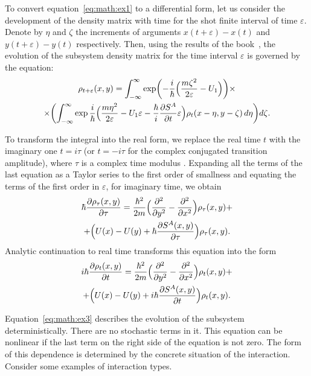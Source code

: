 To convert equation~\eqref{eq:math:ex1} to a differential form, let us consider the development of the density matrix with time for the shot finite interval of time $\varepsilon$. Denote by $\eta$ and $\zeta$ the increments of arguments $x(t+\varepsilon)-x(t)$ and $y(t+\varepsilon)-y(t)$ respectively. Then, using the results of the book~\cite{bib:12}, the evolution of the subsystem density matrix for the time interval $\varepsilon$ is governed by the equation:
\begin{multline*}
\rho_{t+\varepsilon}(x,y)=\int _{-\infty}^{\infty}\exp\biggl(-\frac{i}{\hbar}\Bigl(\frac{m\zeta^2}{2\varepsilon}-U_1\Bigr)\biggr) 
\times 
\\
\times 
\biggl(\int _{-\infty}^{\infty}\exp\frac{i}{\hbar}\Bigl(\frac{m\eta^2}{2\varepsilon}-U_1\varepsilon-\frac{\hbar}{i}\frac{\partial S^A}{\partial t}\varepsilon\Bigr)\rho_t(x-\eta,y-\zeta)\,d\eta \biggr)d\zeta.
\end{multline*}

To transform the integral into the real form, we replace the real time $t$ with the imaginary one $t=i\tau$ (or  $t=-i\tau$ for the complex conjugated transition amplitude), where $\tau$ is a complex time modulus . Expanding all the terms of the last equation as a Taylor series to the first order of smallness and equating the terms of the first order in $\varepsilon$, for imaginary time, we obtain
\begin{multline*}
 \hbar\frac{\partial\rho_{\tau}(x,y)}{\partial \tau}=\frac{\hbar^2}{2m}\Bigl(\frac{\partial^2}{\partial y^2}-\frac{\partial^2}{\partial x^2}\Bigr)\rho_{\tau}(x,y) +
 \\
  +\Bigl(U(x)-U(y)+\hbar\frac{\partial S^A(x,y)}{\partial\tau}\Bigr)\rho_{\tau}(x,y).
\end{multline*} 
Analytic continuation to real time transforms this equation into the form
\begin{multline}\label{eq:math:ex3} 
 i\hbar\frac{\partial\rho_{t}(x,y)}{\partial t}=\frac{\hbar^2}{2m}\Bigl(\frac{\partial^2}{\partial y^2}-\frac{\partial^2}{\partial x^2}\Bigr)\rho_{t}(x,y)+
\\ 
+ \Bigl(U(x)-U(y)+i\hbar\frac{\partial S^A(x,y)}{\partial t}\Bigr)\rho_{t}(x,y).
\end{multline}


Equation~\eqref{eq:math:ex3} describes the evolution of the subsystem deterministically. There are no stochastic terms in it. This equation can be nonlinear if the last term on the  right side of the equation is not zero. The form of this dependence is determined by the concrete situation of the interaction. Consider some examples of interaction types.
 
